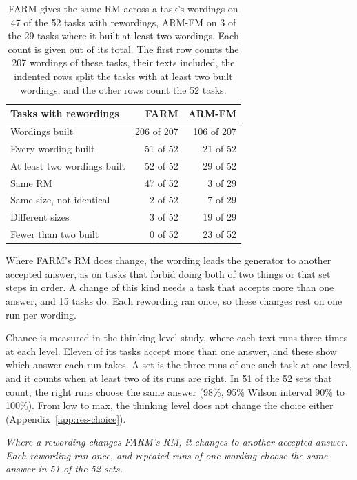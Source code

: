 \documentclass[11pt,english,listoffigures,listoftables]{tfgetsinf}
\newcommand{\keyidea}[1]{\par\smallskip\noindent\hspace*{0.6em}{\color{gray!55}\vrule width 1.5pt}\hspace{8pt}\parbox[t]{\dimexpr\linewidth-0.6em-9.5pt\relax}{\itshape #1}\par\smallskip}  %
\begin{document}
\begin{table}[H]
\centering
\footnotesize
\renewcommand{\arraystretch}{1.2}
\begin{tabular}{@{}lrr@{}}
\toprule
\textbf{Tasks with rewordings} & \textbf{FARM} & \textbf{ARM-FM} \\ \midrule
Wordings built & 206 of 207 & 106 of 207 \\
Every wording built & 51 of 52 & 21 of 52 \\
At least two wordings built & 52 of 52 & 29 of 52 \\
\quad Same RM & 47 of 52 & 3 of 29 \\
\quad Same size, not identical & 2 of 52 & 7 of 29 \\
\quad Different sizes & 3 of 52 & 19 of 29 \\
Fewer than two built & 0 of 52 & 23 of 52 \\ \bottomrule
\end{tabular}
\caption[RMs across rewordings]{FARM gives the same RM across a task's wordings on 47 of the 52 tasks with rewordings, ARM-FM on 3 of the 29 tasks where it built at least two wordings. Each count is given out of its total. The first row counts the 207 wordings of these tasks, their texts included, the indented rows split the tasks with at least two built wordings, and the other rows count the 52 tasks.}
\label{tab:res-rewording}
\end{table}

Where FARM's RM does change, the wording leads the generator to another accepted answer, as on tasks that forbid doing both of two things or that set steps in order. A change of this kind needs a task that accepts more than one answer, and 15 tasks do. Each rewording ran once, so these changes rest on one run per wording.

Chance is measured in the thinking-level study, where each text runs three times at each level. Eleven of its tasks accept more than one answer, and these show which answer each run takes. A set is the three runs of one such task at one level, and it counts when at least two of its runs are right. In 51 of the 52 sets that count, the right runs choose the same answer (98\%, 95\% Wilson interval 90\% to 100\%). From low to max, the thinking level does not change the choice either (Appendix~\ref{app:res-choice}).

\keyidea{Where a rewording changes FARM's RM, it changes to another accepted answer. Each rewording ran once, and repeated runs of one wording choose the same answer in 51 of the 52 sets.}
\end{document}
